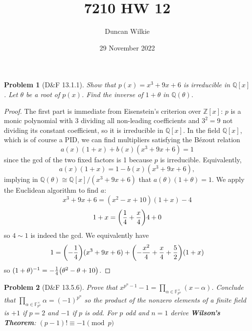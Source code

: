 \documentclass{article}
\title{7210 HW 12}
\author{Duncan Wilkie}
\date{29 November 2022}
\newtheorem{plm}{Problem}
\begin{document}
\maketitle

\begin{plm}[D\&F 13.1.1]
  Show that $p(x) = x^{3} + 9x + 6$ is irreducible in $\mathbb{Q}[x]$.
  Let $\theta$ be a root of $p(x)$.
  Find the inverse of $1 + \theta$ in $\mathbb{Q}(\theta)$.
\end{plm}

\begin{proof}
  The first part is immediate from Eisenstein's criterion over $\mathbb{Z}[x]$:
  $p$ is a monic polynomial with $3$ dividing all non-leading coefficients and $3^{2} = 9$ not dividing its constant coefficient,
  so it is irreducible in $\mathbb{Q}[x]$.
  In the field $\mathbb{Q}[x]$, which is of course a PID, we can find multipliers satisfying the B\'ezout
  relation
  \[
    a(x)(1 + x) + b(x)(x^{3} + 9x + 6) = 1
  \]
  since the gcd of the two fixed factors is 1 because $p$ is irreducible.
  Equivalently,
  \[
    a(x)(1 + x) = 1 - b(x)(x^{3} + 9x + 6),
  \]
  implying in $\mathbb{Q}(\theta) \cong \mathbb{Q}[x] / (x^{3} + 9x + 6)$ that $a(\theta)(1 + \theta) = 1$.
  We apply the Euclidean algorithm to find $a$:
  \[
    x^{3} + 9x + 6 = (x^{2} - x + 10)(1 + x) - 4
  \]
  \[
    1 + x = \qty(\frac{1}{4} + \frac{x}{4})4 + 0
  \]
  so $4 \sim 1$ is indeed the gcd.
  We equivalently have
  \[
    1 = \qty(-\frac{1}{4})(x^{3} + 9x + 6) + \qty(-\frac{x^{2}}{4} + \frac{x}{4} + \frac{5}{2})(1 + x)
  \]
  so $(1 + \theta)^{-1} = -\frac{1}{4}\qty(\theta^{2} - \theta + 10)$.
\end{proof}

\begin{plm}[D\&F 13.5.6]
  Prove that $x^{p^{n} - 1} - 1= \prod_{\alpha \in \mathbb{F}^{\times}_{p^{n}}} (x - \alpha)$.
  Conclude that $\prod_{\alpha \in \mathbb{F}^{\times}_{p^{n}}}\alpha = (-1)^{p^{n}}$ so the product of the nonzero elements of a finite field is $+1$
  if $p = 2$ and $-1$ if $p$ is odd.
  For $p$ odd and $n = 1$ derive \textbf{Wilson's Theorem}: $(p - 1)! \equiv -1 \pmod p$
\end{plm}
\end{document}
